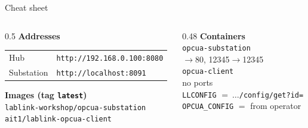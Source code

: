 \documentclass[aspectratio=169,10pt]{beamer}
\newcommand{\cmd}[1]{\texttt{#1}}               %
\begin{document}
\begin{frame}{Cheat sheet}
  \small
  \begin{columns}[T]
    \begin{column}{0.5\textwidth}
      \textbf{Addresses}\\[2pt]
      \begin{tabular}{@{}ll@{}}
        Hub          & \cmd{http://192.168.0.100:8080} \\
        Substation   & \cmd{http://localhost:8091} \\
      \end{tabular}

      \vspace{0.8em}
      \textbf{Images (tag \cmd{latest})}\\[2pt]
      \cmd{lablink-workshop/opcua-substation}\\
      \cmd{ait1/lablink-opcua-client}
    \end{column}
    \begin{column}{0.48\textwidth}
      \textbf{Containers}\\[2pt]
      \cmd{opcua-substation}\\
      $\rightarrow$80, 12345$\rightarrow$12345\\[4pt]
      \cmd{opcua-client}\\
      \quad no ports\\
      \quad \cmd{LLCONFIG} $=\ \ldots$\cmd{/config/get?id=}\\
      \quad \cmd{OPCUA\_CONFIG} $=$ from operator
    \end{column}
  \end{columns}
\end{frame}
\end{document}
